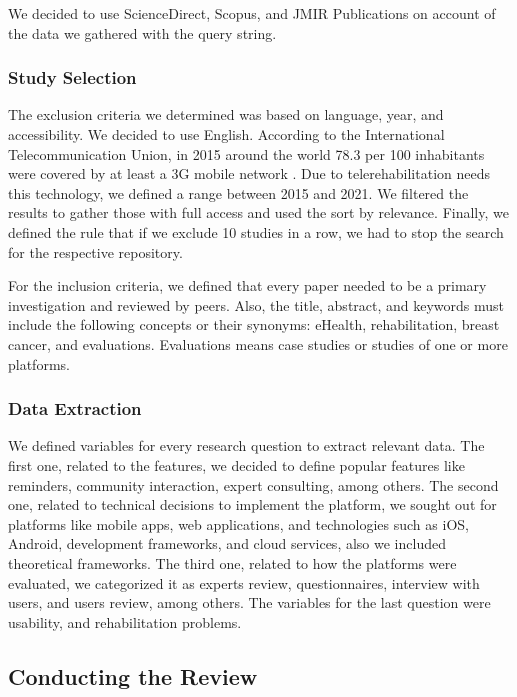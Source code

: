 \documentclass[conference]{IEEEtran}
\begin{document}
We decided to use ScienceDirect, Scopus, and JMIR Publications on account of the data we gathered with the query string.

\subsubsection{Study Selection}

The exclusion criteria we determined was based on language, year, and accessibility.  We decided to use English. According to the International Telecommunication Union, in 2015 around the world 78.3 per 100 inhabitants were covered by at least a 3G mobile network \cite{ITU}. Due to telerehabilitation needs this technology, we defined a range between 2015 and 2021. We filtered the results to gather those with full access and used the sort by relevance. Finally, we defined the rule that if we exclude 10 studies in a row, we had to stop the search for the respective repository.

For the inclusion criteria, we defined that every paper needed to be a primary investigation and reviewed by peers. Also, the title, abstract, and keywords must include the following concepts or their synonyms: eHealth, rehabilitation, breast cancer, and evaluations. Evaluations means case studies or studies of one or more platforms.

\subsubsection{Data Extraction}
We defined variables for every research question to extract relevant data. The first one, related to the features, we decided to define popular features like reminders, community interaction, expert consulting, among others. The second one, related to technical decisions to implement the platform, we sought out for platforms like mobile apps, web applications, and technologies such as iOS, Android, development frameworks, and cloud services, also we included theoretical frameworks. The third one, related to how the platforms were evaluated, we categorized it as experts review, questionnaires, interview with users, and users review, among others. The variables for the last question were usability, and rehabilitation problems.

\subsection{Conducting the Review}
\label{section:conducting_review}
\end{document}
